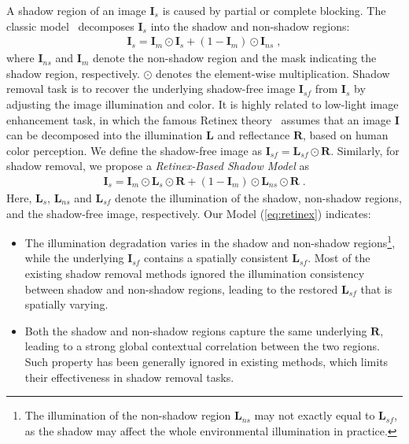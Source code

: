 \documentclass[letterpaper]{article} \usepackage{aaai23}  \usepackage{times}  \usepackage{helvet}  \usepackage{courier}  \usepackage[hyphens]{url}  \usepackage{graphicx} \urlstyle{rm} \def\UrlFont{\rm}  \usepackage{natbib}  \usepackage{caption} \frenchspacing  \setlength{\pdfpagewidth}{8.5in} \setlength{\pdfpageheight}{11in} \usepackage{algorithm}
\begin{document}
{A shadow region of an image $\mathbf{I}_s$ is caused by partial or complete blocking. 
The classic model~\cite{porter1984compositing} decomposes $\mathbf{I}_s$ into the shadow and non-shadow regions:
}
\begin{align}
     \mathbf{I}_{s}= \mathbf{I}_m \odot \mathbf{I}_{s} + (1-\mathbf{I}_m) \odot \mathbf{I}_{ns}  \;,
      \label{eq:problem}
\end{align}
{where $\mathbf{I}_{ns}$ and $\mathbf{I}_m$ denote the non-shadow region and the mask indicating the shadow region, respectively. $\odot$ denotes the element-wise multiplication.
Shadow removal task is to recover the underlying shadow-free image $\mathbf{I}_{sf}$ from $\mathbf{I}_s$ by adjusting the image illumination and color. It is highly related to low-light image enhancement task, in which the famous Retinex theory~\cite{land1977retinex} assumes that an image $\mathbf{I}$ can be decomposed into the illumination $\mathbf{L}$ and reflectance $\mathbf{R}$, based on human color perception. We define the shadow-free image as $\mathbf{I}_{sf} = \mathbf{L}_{sf} \odot \mathbf{R}$.
Similarly, for shadow removal, we propose a \textit{Retinex-Based Shadow Model} as}
\begin{align}
      \mathbf{I}_{s} = \mathbf{I}_m \odot \mathbf{L}_{s} \odot \mathbf{R} + (1-\mathbf{I}_m) \odot \mathbf{L}_{ns} \odot \mathbf{R}\;.
      \label{eq:retinex}
\end{align}
{Here, $\mathbf{L}_{s}$, $\mathbf{L}_{ns}$ and $\mathbf{L}_{sf}$ denote the illumination of the shadow, non-shadow regions, and the shadow-free image, respectively. Our Model (\ref{eq:retinex}) indicates:}
\begin{itemize}
\item The illumination degradation varies in the shadow and non-shadow regions\footnote{The illumination of the non-shadow region $\mathbf{L}_{ns}$ may not exactly equal to $\mathbf{L}_{sf}$, as the shadow may affect the whole environmental illumination in practice.}, while the underlying $\mathbf{I}_{sf}$ contains a spatially consistent $\mathbf{L}_{sf}$. 
Most of the existing shadow removal methods ignored the  illumination consistency between shadow and non-shadow regions, leading to the restored $\mathbf{L}_{sf}$ that is spatially varying.
\item Both the shadow and non-shadow regions capture the same underlying $\mathbf{R}$, leading to a strong global contextual correlation between the two regions. Such property has been generally ignored in existing methods, which limits their effectiveness in shadow removal tasks. 
\end{itemize}
\end{document}
